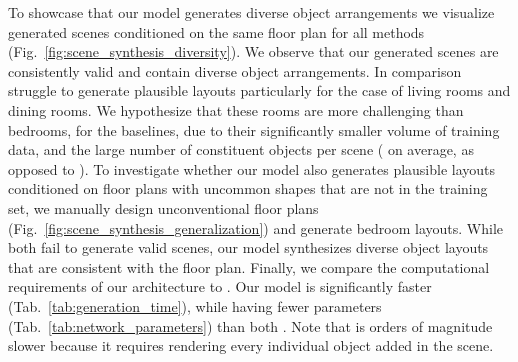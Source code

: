 \documentclass{article}
\newcommand{\figref}[1]{Fig.~\ref{#1}}
\newcommand{\tabref}[1]{Tab.~\ref{#1}}
\begin{document}
To showcase that our model generates diverse object arrangements we
visualize  generated scenes conditioned on the same floor plan for all
methods (\figref{fig:scene_synthesis_diversity}). We observe that our generated
scenes are consistently valid and contain diverse object arrangements. In comparison
\cite{Ritchie2019CVPR, Wang2020ARXIV} struggle to generate plausible layouts
particularly for the case of living rooms and dining rooms. We hypothesize that these rooms are more challenging than bedrooms, for the baselines, due to their significantly smaller volume of training data,
and the large number of constituent objects per scene ( on average, as opposed to ).
To investigate whether our model 
also generates plausible layouts conditioned on floor plans with
uncommon shapes that are not in the training set, we manually design unconventional floor plans (\figref{fig:scene_synthesis_generalization}) and generate bedroom layouts.
While both \cite{Ritchie2019CVPR, Wang2020ARXIV} fail to generate valid scenes,
our model synthesizes diverse object layouts that are consistent with the floor plan.
Finally, we compare the computational requirements of our architecture to
\cite{Ritchie2019CVPR, Wang2020ARXIV}. Our model is significantly faster
(\tabref{tab:generation_time}), while having fewer parameters
(\tabref{tab:network_parameters}) than both \cite{Ritchie2019CVPR, Wang2020ARXIV}. Note
that \cite{Ritchie2019CVPR} is orders of magnitude slower because it requires
rendering every individual object added in the scene.
\end{document}
